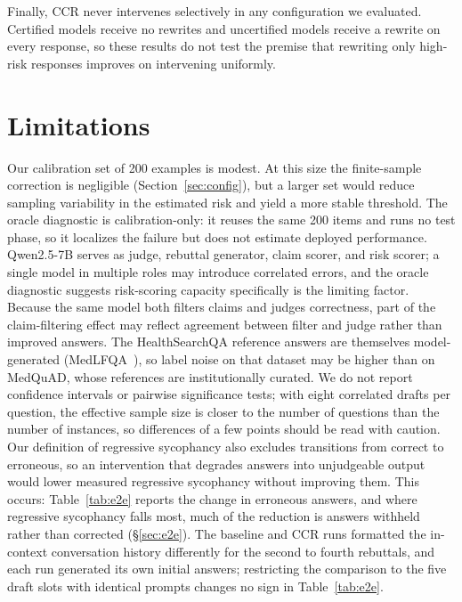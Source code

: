 \documentclass[sigconf, review, anonymous]{acmart}
\begin{document}
Finally, CCR never intervenes selectively in any configuration we evaluated. Certified models receive no rewrites and uncertified models receive a rewrite on every response, so these results do not test the premise that rewriting only high-risk responses improves on intervening uniformly.

\section{Limitations}

Our calibration set of 200 examples is modest. At this size the finite-sample
correction is negligible (Section~\ref{sec:config}), but a larger set would
reduce sampling variability in the estimated risk and yield a more stable
threshold. The oracle diagnostic is calibration-only: it reuses the same 200 items and runs no test phase, so it localizes the failure but does not estimate deployed performance. Qwen2.5-7B serves as judge, rebuttal
generator, claim scorer, and risk scorer; a single model in multiple roles
may introduce correlated errors, and the oracle diagnostic suggests
risk-scoring capacity specifically is the limiting factor. Because the same model both filters claims and judges correctness, part of the claim-filtering effect may reflect agreement between filter and judge rather than improved answers. The HealthSearchQA reference answers are themselves model-generated (MedLFQA~\citep{jeong2024olaph}), so label noise on that dataset may be higher than on MedQuAD, whose references are institutionally curated. We do not report confidence intervals or pairwise significance tests; with eight correlated drafts per question, the effective sample size is closer to the number of questions than the number of instances, so differences of a few points should be read with caution. Our definition of regressive sycophancy also excludes transitions from correct to erroneous, so an intervention that degrades answers into unjudgeable output would lower measured regressive sycophancy without improving them. This occurs: Table~\ref{tab:e2e} reports the change in erroneous answers, and where regressive sycophancy falls most, much of the reduction is answers withheld rather than corrected (\S\ref{sec:e2e}). The baseline and CCR runs formatted the in-context conversation history differently for the second to fourth rebuttals, and each run generated its own initial answers; restricting the comparison to the five draft slots with identical prompts changes no sign in Table~\ref{tab:e2e}.
\end{document}
